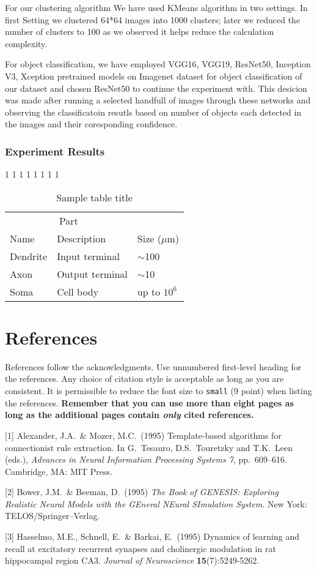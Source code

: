 \documentclass{article}
\begin{document}
For our clustering algorithm We have used KMeans algorithm in two settings. In first Setting we clustered 64*64 images into 1000 clusters; later we reduced the number of clusters to 100 as we observed it helps reduce the calculation complexity.

For object classification, we have employed VGG16, VGG19, ResNet50, Inception V3, Xception pretrained models on Imagenet dataset for object classification of our dataset and chosen ResNet50 to continue the experiment with. This desicion was made after running a selected handfull of images through these networks and observing the classificatoin resutls based on number of objects each detected in the images and their coresponding confidence.

\subsubsection{Experiment Results}
1
1
1
1
1
1
1
1


\begin{table}
  \caption{Sample table title}
  \label{sample-table}
  \centering
  \begin{tabular}{lll}
    \toprule
    \multicolumn{2}{c}{Part}                   \\
    \cmidrule(r){1-2}
    Name     & Description     & Size ($\mu$m) \\
    \midrule
    Dendrite & Input terminal  & $\sim$100     \\
    Axon     & Output terminal & $\sim$10      \\
    Soma     & Cell body       & up to $10^6$  \\
    \bottomrule
  \end{tabular}
\end{table}

\section*{References}

References follow the acknowledgments. Use unnumbered first-level
heading for the references. Any choice of citation style is acceptable
as long as you are consistent. It is permissible to reduce the font
size to \verb+small+ (9 point) when listing the references. {\bf
  Remember that you can use more than eight pages as long as the
  additional pages contain \emph{only} cited references.}
\medskip

\small

[1] Alexander, J.A.\ \& Mozer, M.C.\ (1995) Template-based algorithms
for connectionist rule extraction. In G.\ Tesauro, D.S.\ Touretzky and
T.K.\ Leen (eds.), {\it Advances in Neural Information Processing
  Systems 7}, pp.\ 609--616. Cambridge, MA: MIT Press.

[2] Bower, J.M.\ \& Beeman, D.\ (1995) {\it The Book of GENESIS:
  Exploring Realistic Neural Models with the GEneral NEural SImulation
  System.}  New York: TELOS/Springer--Verlag.

[3] Hasselmo, M.E., Schnell, E.\ \& Barkai, E.\ (1995) Dynamics of
learning and recall at excitatory recurrent synapses and cholinergic
modulation in rat hippocampal region CA3. {\it Journal of
  Neuroscience} {\bf 15}(7):5249-5262.
\end{document}
